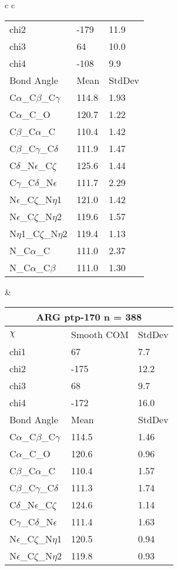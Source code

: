 \begin{longtable}{ c c }
\begin{tabular}{ l l l }
  chi2 & -179 & 11.9 \\ 
  chi3 & 64 & 10.0 \\ 
  chi4 & -108 & 9.9 \\ \midrule
  Bond Angle   & Mean     & StdDev \\ \midrule
  C$\alpha$\_C$\beta$\_C$\gamma$ & 114.8 & 1.93\\
  C$\alpha$\_C\_O & 120.7 & 1.22\\
  C$\beta$\_C$\alpha$\_C & 110.4 & 1.42\\
  C$\beta$\_C$\gamma$\_C$\delta$ & 111.9 & 1.47\\
  C$\delta$\_N$\epsilon$\_C$\zeta$ & 125.6 & 1.44\\
  C$\gamma$\_C$\delta$\_N$\epsilon$ & 111.7 & 2.29\\
  N$\epsilon$\_C$\zeta$\_N$\eta$1 & 121.0 & 1.42\\
  N$\epsilon$\_C$\zeta$\_N$\eta$2 & 119.6 & 1.57\\
  N$\eta$1\_C$\zeta$\_N$\eta$2 & 119.4 & 1.13\\
  N\_C$\alpha$\_C & 111.0 & 2.37\\
  N\_C$\alpha$\_C$\beta$ & 111.0 & 1.30\\
  \bottomrule
  \end{tabular}
  &
  \begin{tabular}{ l l l }
  \toprule
  \multicolumn{3}{c}{ARG \textbf{ptp-170} n = 388} \\ \toprule
  $\chi$       & Smooth COM & StdDev \\ \midrule
  chi1 & 67 & 7.7 \\ 
  chi2 & -175 & 12.2 \\ 
  chi3 & 68 & 9.7 \\ 
  chi4 & -172 & 16.0 \\ \midrule
  Bond Angle   & Mean     & StdDev \\ \midrule
  C$\alpha$\_C$\beta$\_C$\gamma$ & 114.5 & 1.46\\
  C$\alpha$\_C\_O & 120.6 & 0.96\\
  C$\beta$\_C$\alpha$\_C & 110.4 & 1.57\\
  C$\beta$\_C$\gamma$\_C$\delta$ & 111.3 & 1.74\\
  C$\delta$\_N$\epsilon$\_C$\zeta$ & 124.6 & 1.14\\
  C$\gamma$\_C$\delta$\_N$\epsilon$ & 111.4 & 1.63\\
  N$\epsilon$\_C$\zeta$\_N$\eta$1 & 120.5 & 0.94\\
  N$\epsilon$\_C$\zeta$\_N$\eta$2 & 119.8 & 0.93\\

\end{tabular}
\end{longtable}
